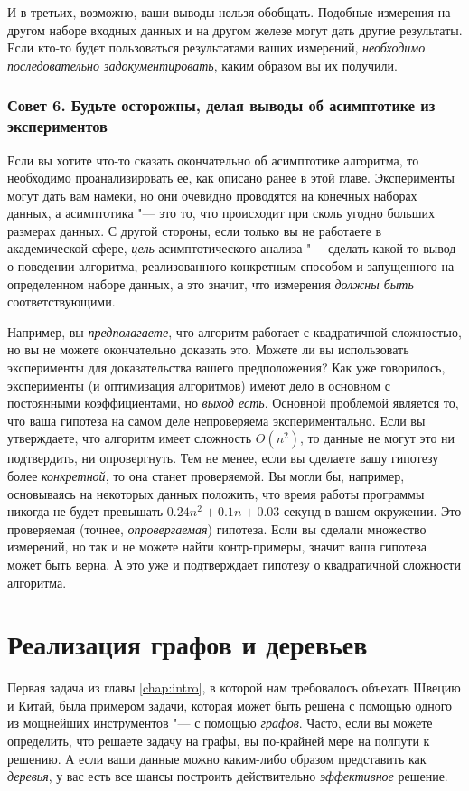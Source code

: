 И в-третьих, возможно, ваши выводы нельзя обобщать. Подобные измерения на другом наборе входных данных и на другом железе могут дать другие результаты. Если кто-то будет пользоваться результатами ваших измерений, \textit{необходимо последовательно задокументировать}, каким образом вы их получили.

\subsubsection*{Совет 6. Будьте осторожны, делая выводы об асимптотике из экспериментов}

Если вы хотите что-то сказать окончательно об асимптотике алгоритма, то необходимо проанализировать ее, как описано ранее в этой главе. Эксперименты могут дать вам намеки, но они очевидно проводятся на конечных наборах данных, а асимптотика "--- это то, что происходит при сколь угодно больших размерах данных. С другой стороны, если только вы не работаете в академической сфере, \textit{цель} асимптотического анализа "--- сделать какой-то вывод о поведении алгоритма, реализованного конкретным способом и запущенного на определенном наборе данных, а это значит, что измерения \textit{должны быть} соответствующими.

Например, вы \textit{предполагаете}, что алгоритм работает с квадратичной сложностью, но вы не можете окончательно доказать это. Можете ли вы использовать эксперименты для доказательства вашего предположения? Как уже говорилось, эксперименты (и оптимизация алгоритмов) имеют дело в основном с постоянными коэффициентами, но \textit{выход есть}. Основной проблемой является то, что ваша гипотеза на самом деле непроверяема экспериментально. Если вы утверждаете, что алгоритм имеет сложность $O(n^2)$, то данные не могут это ни подтвердить, ни опровергнуть. Тем не менее, если вы сделаете вашу гипотезу более \textit{конкретной}, то она станет проверяемой. Вы могли бы, например, основываясь на некоторых данных положить, что время работы программы никогда не будет превышать $0.24n^2+0.1n+0.03$ секунд в вашем окружении. Это проверяемая (точнее, \textit{опровергаемая}) гипотеза. Если вы сделали множество измерений, но так и не можете найти контр-примеры, значит ваша гипотеза может быть верна. А это уже и подтверждает гипотезу о квадратичной сложности алгоритма.

\section{Реализация графов и деревьев }
\label{sec:implementing-graphs-and-trees}
Первая задача из главы \ref{chap:intro}, в которой нам требовалось объехать Швецию и Китай, была примером задачи, которая может быть решена с помощью одного из мощнейших инструментов "--- с помощью \textit{графов}. Часто, если вы можете определить, что решаете задачу на графы, вы по-крайней мере на полпути к решению. А если ваши данные можно каким-либо образом представить как \textit{деревья}, у вас есть все шансы построить действительно \textit{эффективное} решение.

